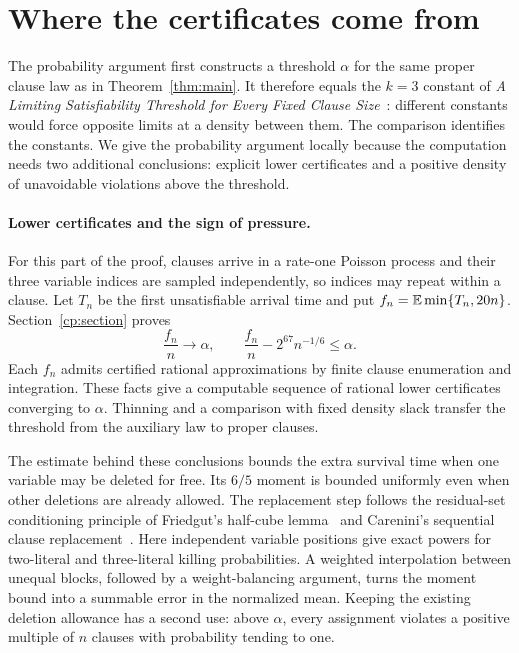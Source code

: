 \section{Where the certificates come from}\label{sec:proof-map}

The probability argument first constructs a threshold $\alpha$ for the
same proper clause law as in Theorem~\ref{thm:main}. It therefore equals
the $k=3$ constant of \emph{A Limiting Satisfiability Threshold for Every
Fixed Clause Size}~\cite[Theorem~1.1]{FixedClauseThreshold}: different
constants would force opposite limits at a density between them. The
comparison identifies the constants. We give the probability argument
locally because the computation needs two additional conclusions:
explicit lower certificates and a positive density of unavoidable
violations above the threshold.

\paragraph{Lower certificates and the sign of pressure.}
For this part of the proof, clauses arrive in a rate-one Poisson process
and their three variable indices are sampled independently, so indices
may repeat within a clause. Let $T_n$ be the first unsatisfiable arrival
time and put $f_n=\mathbb E\min\{T_n,20n\}$. Section~\ref{cp:section} proves
\[
 \frac{f_n}{n}\longrightarrow\alpha,
 \qquad \frac{f_n}{n}-2^{67}n^{-1/6}\le\alpha.
\]
Each $f_n$ admits certified rational approximations by finite clause
enumeration and integration. These facts give a computable sequence of
rational lower certificates converging to $\alpha$. Thinning and a
comparison with fixed density slack transfer the threshold from the
auxiliary law to proper clauses.

The estimate behind these conclusions bounds the extra survival time
when one variable may be deleted for free. Its $6/5$ moment is bounded
uniformly even when other deletions are already allowed. The replacement
step follows the residual-set conditioning principle of Friedgut's
half-cube lemma~\cite[Lemma~5.7]{Friedgut1999} and Carenini's sequential
clause replacement~\cite[Theorem~4.3 and Lemma~6.1]{Carenini}. Here
independent variable positions give exact powers for two-literal and
three-literal killing probabilities. A weighted interpolation between
unequal blocks, followed by a weight-balancing argument, turns the moment
bound into a summable error in the normalized mean. Keeping the existing
deletion allowance has a second use: above $\alpha$, every assignment
violates a positive multiple of $n$ clauses with probability tending to
one.

